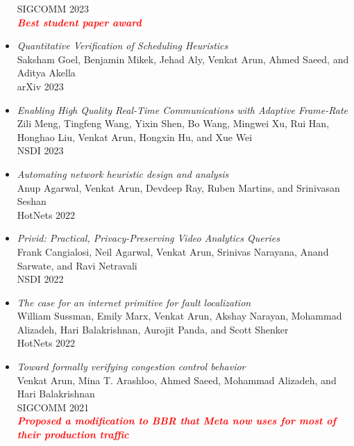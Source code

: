 \documentclass[notitlepage]{article}
\newcommand{\highlight}[1]{\textcolor{red}{\textit{\textbf{#1}}}}
\begin{document}
\begin{itemize}[noitemsep,nolistsep]
      SIGCOMM 2023\\
              \highlight{Best student paper award}\\
              \item {\it Quantitative Verification of Scheduling Heuristics}\label{paper:perf_verif}\\
      Saksham Goel, Benjamin Mikek, Jehad Aly, Venkat Arun, Ahmed Saeed, and Aditya Akella\\
      arXiv 2023\\
              \item {\it Enabling High Quality Real-Time Communications with Adaptive Frame-Rate}\label{paper:afr}\\
      Zili Meng, Tingfeng Wang, Yixin Shen, Bo Wang, Mingwei Xu, Rui Han, Honghao Liu, Venkat Arun, Hongxin Hu, and Xue Wei\\
      NSDI 2023\\
              \item {\it Automating network heuristic design and analysis}\label{paper:ccmatic_hotnets}\\
      Anup Agarwal, Venkat Arun, Devdeep Ray, Ruben Martins, and Srinivasan Seshan\\
      HotNets 2022\\
              \item {\it Privid: Practical, Privacy-Preserving Video Analytics Queries}\label{paper:privid}\\
      Frank Cangialosi, Neil Agarwal, Venkat Arun, Srinivas Narayana, Anand Sarwate, and Ravi Netravali\\
      NSDI 2022\\
              \item {\it The case for an internet primitive for fault localization}\label{paper:wtf}\\
      William Sussman, Emily Marx, Venkat Arun, Akshay Narayan, Mohammad Alizadeh, Hari Balakrishnan, Aurojit Panda, and Scott Shenker\\
      HotNets 2022\\
              \item {\it Toward formally verifying congestion control behavior}\label{paper:ccac}\\
      Venkat Arun, Mina T. Arashloo, Ahmed Saeed, Mohammad Alizadeh, and Hari Balakrishnan\\
      SIGCOMM 2021\\
              \highlight{Proposed a modification to BBR that Meta now uses for most of their production traffic}\\

\end{itemize}
\end{document}
